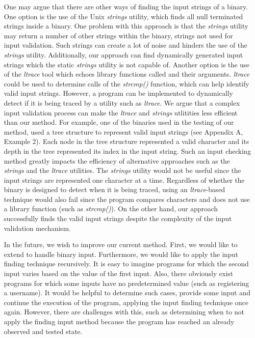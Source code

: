 \documentclass{acm_proc_article-sp}
\begin{document}
One may argue that there are other ways of finding the input strings of a binary.
One option is the use of the Unix \textit{strings} utility, which finds all null terminated strings inside a binary.
One problem with this approach is that the \textit{strings} utility may return a number of other strings within the binary, strings not used for input validation.
Such strings can create a lot of noise and hinders the use of the \textit{strings} utility.
Additionally, our approach can find dynamically generated input strings which the static \textit{strings} utility is not capable of.
Another option is the use of the \textit{ltrace} tool which echoes library functions called and their arguments.
\textit{ltrace} could be used to determine calls of the \textit{strcmp()} function, which can help identify valid input strings.
However, a program can be implemented to dynamically detect if it is being traced by a utility such as \textit{ltrace}.
We argue that a complex input validation process can make the \textit{ltrace} and \textit{strings} utlitities less efficient than our method.
For example, one of the binaries used in the testing of our method, used a tree structure to represent valid input strings (see Appendix A, Example 2).
Each node in the tree structure represented a valid character and its depth in the tree represented its index in the input string.
Such an input checking method greatly impacts the efficiency of alternative approaches such as the \textit{strings} and the \textit{ltrace} utilities.
The \textit{strings} utility would not be useful since the input strings are represented one character at a time.
Regardless of whether the binary is designed to detect when it is being traced, using an \textit{ltrace}-based technique would also fail since the program compares characters and does not use a library function (such as \textit{strcmp()}).
On the other hand, our approach successfully finds the valid input strings despite the complexity of the input validation mechanism.

In the future, we wish to improve our current method.
First, we would like to extend to handle binary input.
Furthermore, we would like to apply the input finding technique recursively.
It is easy to imagine programs for which the second input varies based on the value of the first input.
Also, there obviously exist programs for which some inputs have no predetermined value (such as registering a username).
It would be helpful to determine such cases, provide some input and continue the execution of the program, applying the input finding technique once again.
However, there are challenges with this, such as determining when to not apply the finding input method because the program has reached an already observed and tested state.
\end{document}
